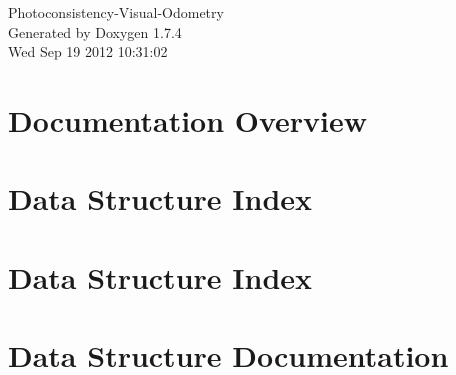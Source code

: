 \documentclass[a4paper]{book}
\begin{document}
\hypersetup{pageanchor=false}
\begin{titlepage}
\vspace*{7cm}
\begin{center}
{\Large Photoconsistency-\/Visual-\/Odometry }\\
\vspace*{1cm}
{\large Generated by Doxygen 1.7.4}\\
\vspace*{0.5cm}
{\small Wed Sep 19 2012 10:31:02}\\
\end{center}
\end{titlepage}
\clearemptydoublepage
{}
\tableofcontents
\clearemptydoublepage
{}
\hypersetup{pageanchor=true}
\chapter{Documentation Overview}
\label{index}\hypertarget{index}{}
\chapter{Data Structure Index}

\chapter{Data Structure Index}

\chapter{Data Structure Documentation}










\printindex
\end{document}

